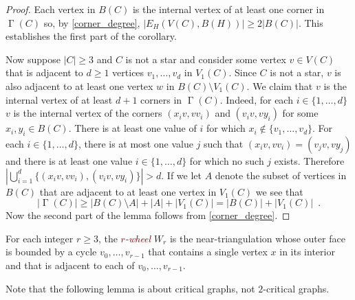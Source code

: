 \documentclass[12pt]{article}
\newtheorem{lem}{Lemma}
\DeclareMathOperator{\corners}{\Gamma}
\newcommand{\defin}[1]{\emph{\textcolor{Maroon}{#1}}}
\theoremstyle{definition}
\begin{document}
\begin{proof}
  Each vertex in $B(C)$ is the internal vertex of at least one corner in $\corners(C)$ so, by \cref{corner_degree}, $|E_H(V(C),B(H))|\ge 2|B(C)|$.  This establishes the first part of the corollary.

  Now suppose $|C|\ge 3$ and $C$ is not a star and consider some vertex $v\in V(C)$ that is adjacent to $d\ge 1$ vertices $v_1,\ldots,v_d$ in $V_1(C)$.  Since $C$ is not a star, $v$ is also adjacent to at least one vertex $w$ in $B(C)\setminus V_1(C)$. We claim that $v$ is the internal vertex of at least $d+1$ corners in $\corners(C)$. Indeed, for each $i\in\{1,\ldots,d\}$ $v$ is the internal vertex of the corners $(x_iv,vv_i)$ and $(v_iv,vy_i)$ for some $x_i,y_i\in B(C)$.  There is at least one value of $i$ for which $x_i\not\in\{v_1,\ldots,v_d\}$.
  For each $i\in\{1,\ldots,d\}$, there is at most one value $j$ such that $(x_iv,vv_i)=(v_jv,vy_j)$ and there is at least one value $i\in\{1,\ldots,d\}$ for which no such $j$ exists.  Therefore
  $
  |\bigcup_{i=1}^d \{(x_iv,vv_i),(v_iv,vy_i)\}| > d.
  $
  If we let $A$ denote the subset of vertices in $B(C)$ that are adjacent to at least one vertex in $V_1(C)$ we see that
  \[
    |\corners(C)| \ge |B(C)\setminus A| + |A| + |V_1(C)|
    = |B(C)| + |V_1(C)|  \enspace .
  \]
  Now the second part of the lemma follows from \cref{corner_degree}.
\end{proof}

%
%
%

For each integer $r\ge 3$, the \defin{$r$-wheel} $W_r$ is the near-triangulation whose outer face is bounded by a cycle $v_0,\ldots,v_{r-1}$ that contains a single vertex $x$ in its interior and that is adjacent to each of $v_0,\ldots,v_{r-1}$.

Note that the following lemma is about critical graphs, not $2$-critical graphs.
\end{document}
